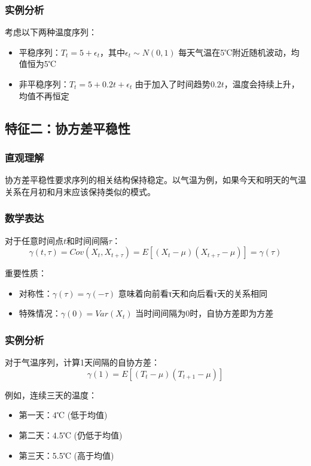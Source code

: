 \subsubsection{实例分析}
考虑以下两种温度序列：
\begin{itemize}
    \item 平稳序列：$T_t = 5 + \epsilon_t$，其中$\epsilon_t \sim N(0,1)$
    每天气温在5℃附近随机波动，均值恒为5℃
    
    \item 非平稳序列：$T_t = 5 + 0.2t + \epsilon_t$
    由于加入了时间趋势$0.2t$，温度会持续上升，均值不再恒定
\end{itemize}

\subsection{特征二：协方差平稳性}
\subsubsection{直观理解}
协方差平稳性要求序列的相关结构保持稳定。以气温为例，如果今天和明天的气温关系在月初和月末应该保持类似的模式。

\subsubsection{数学表达}
对于任意时间点$t$和时间间隔$\tau$：
$$\gamma(t,\tau) = Cov(X_t, X_{t+\tau}) = E[(X_t-\mu)(X_{t+\tau}-\mu)] = \gamma(\tau)$$

重要性质：
\begin{itemize}
    \item 对称性：$\gamma(\tau) = \gamma(-\tau)$
    意味着向前看τ天和向后看τ天的关系相同
    
    \item 特殊情况：$\gamma(0) = Var(X_t)$
    当时间间隔为0时，自协方差即为方差
\end{itemize}

\subsubsection{实例分析}
对于气温序列，计算1天间隔的自协方差：
$$\gamma(1) = E[(T_t-\mu)(T_{t+1}-\mu)]$$

例如，连续三天的温度：
\begin{itemize}
    \item 第一天：4℃ (低于均值)
    \item 第二天：4.5℃ (仍低于均值)
    \item 第三天：5.5℃ (高于均值)
\end{itemize}

